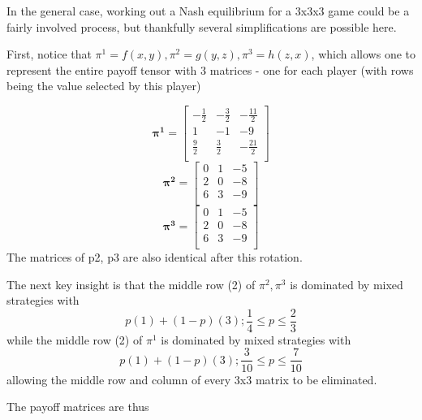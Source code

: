 \documentclass[12pt, a4paper]{article}
\begin{document}
In the general case, working out a Nash equilibrium for a 3x3x3 game could be a fairly involved process, but thankfully several simplifications are possible here.

First, notice that $\pi^1=f(x,y), \pi^2=g(y,z), \pi^3=h(z,x)$, which allows one to represent the entire payoff tensor with 3 matrices - one for each player (with rows being the value selected by this player)

\begin{equation}
    \boldsymbol{\pi^1}=\begin{bmatrix}
        -\frac{1}{2} & -\frac{3}{2} & -\frac{11}{2} \\
        1 & -1 & -9 \\
        \frac{9}{2} & \frac{3}{2} & -\frac{21}{2} \\ 
    \end{bmatrix}
\end{equation}
\begin{equation}
    \boldsymbol{\pi^2}=\begin{bmatrix}
        0 & 1 & -5 \\
        2 & 0 & -8 \\
        6 & 3 & -9 \\ 
    \end{bmatrix}
\end{equation}
\begin{equation}
    \boldsymbol{\pi^3}=\begin{bmatrix}
        0 & 1 & -5 \\
        2 & 0 & -8 \\
        6 & 3 & -9 \\ 
    \end{bmatrix}
\end{equation}
The matrices of p2, p3 are also identical after this rotation.

The next key insight is that the middle row (2) of $\pi^2, \pi^3$ is dominated by mixed strategies with
\begin{equation}
    p(1)+(1-p)(3);\frac{1}{4} \leq p \leq \frac{2}{3}
\end{equation}
while the middle row (2) of $\pi^1$ is dominated by mixed strategies with
\begin{equation}
    p(1)+(1-p)(3);\frac{3}{10} \leq p \leq \frac{7}{10}
\end{equation}
allowing the middle row and column of every 3x3 matrix to be eliminated. 

The payoff matrices are thus
\end{document}
